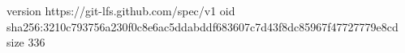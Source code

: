 version https://git-lfs.github.com/spec/v1
oid sha256:3210c793756a230f0c8e6ac5ddabddf683607c7d43f8dc85967f47727779e8cd
size 336
